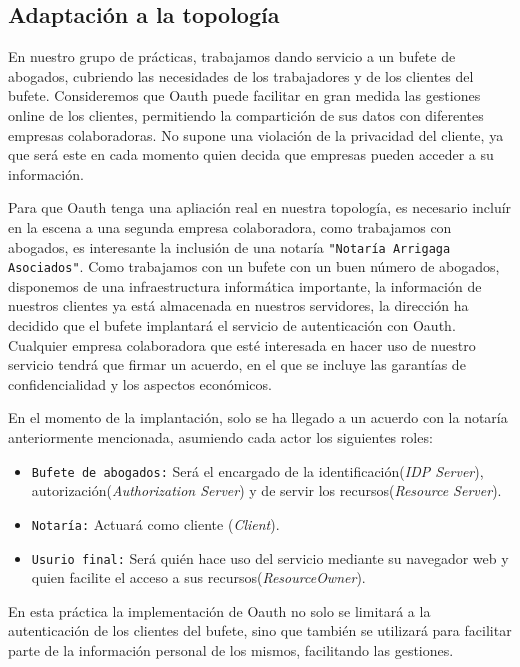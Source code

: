 \documentclass[a4,12pt,onecolum]{article}
\begin{document}

\subsection{Adaptación a la topología}
En nuestro grupo de prácticas, trabajamos dando servicio a un bufete de abogados, cubriendo las necesidades de los trabajadores y de los clientes del bufete. Consideremos que Oauth puede facilitar en gran medida las gestiones online de los clientes, permitiendo la compartición de sus datos con diferentes empresas colaboradoras. No supone una violación de la privacidad del cliente, ya que será este en cada momento quien decida que empresas pueden acceder a su información.

Para que Oauth tenga una apliación real en nuestra topología, es necesario incluír en la escena a una segunda empresa colaboradora, como trabajamos con abogados, es interesante la inclusión de una notaría \texttt{"Notaría Arrigaga Asociados"}. Como trabajamos con un bufete con un buen número de abogados, disponemos de una infraestructura informática  importante, la información de nuestros clientes ya está almacenada en nuestros servidores, la dirección ha decidido que el bufete implantará el servicio de autenticación con Oauth. Cualquier empresa colaboradora que esté interesada en hacer uso de nuestro servicio tendrá que firmar un acuerdo, en el que se incluye las garantías de confidencialidad y los aspectos económicos.

En el momento de la implantación, solo se ha llegado a un acuerdo con la notaría anteriormente mencionada, asumiendo cada actor los siguientes roles:
\begin{itemize}
\item \texttt{Bufete de abogados:} Será el encargado de la identificación(\emph{IDP Server}), autorización(\emph{Authorization Server}) y de servir los recursos(\emph{Resource Server}).
\item \texttt{Notaría:} Actuará como cliente (\emph{Client}).
\item \texttt{Usurio final:} Será quién hace uso del servicio mediante su navegador web y quien facilite el acceso a sus recursos(\emph{ResourceOwner}). 
\end{itemize}

En esta práctica la implementación de Oauth no solo se limitará a la autenticación de los clientes del bufete, sino que también se utilizará para facilitar parte de la información personal de los mismos, facilitando las gestiones.
\end{document}
